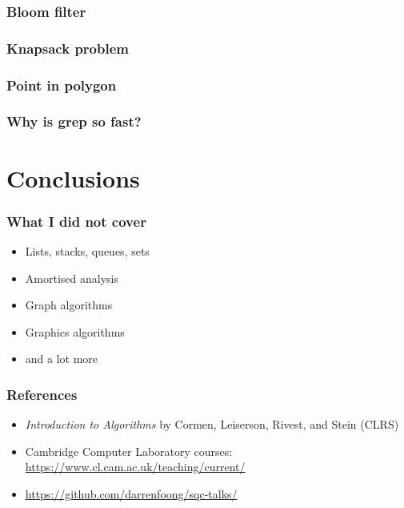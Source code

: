 \documentclass{beamer}
\begin{document}
\begin{frame}
 \frametitle{Bloom filter}
\end{frame}

\begin{frame}
 \frametitle{Knapsack problem}
\end{frame}

\begin{frame}
 \frametitle{Point in polygon}
\end{frame}

\begin{frame}
 \frametitle{Why is grep so fast?}
\end{frame}

\section{Conclusions}

\begin{frame}
 \frametitle{What I did not cover}
 \begin{itemize}
  \item Lists, stacks, queues, sets
  \item Amortised analysis
  \item Graph algorithms
  \item Graphics algorithms
  \item and a lot more
 \end{itemize}
\end{frame}

\begin{frame}
 \frametitle{References}
 \begin{itemize}
  \item \emph{Introduction to Algorithms} by Cormen, Leiserson, Rivest, and Stein (CLRS)
  \item Cambridge Computer Laboratory courses: \url{https://www.cl.cam.ac.uk/teaching/current/}
  \item \url{https://github.com/darrenfoong/sqc-talks/}
 \end{itemize}
\end{frame}
\end{document}
